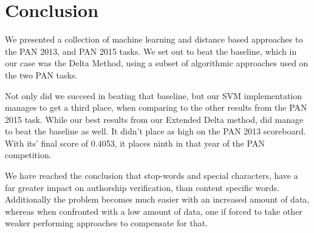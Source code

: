 \section{Conclusion} \label{sec:conclusion} 

We presented a collection of machine learning and distance based approaches
to the PAN 2013, and PAN 2015 tasks. We set out to beat the baseline, 
which in our case was the Delta Method, using a subset of algorithmic
approaches used on the two PAN tasks. 

Not only did we succeed in beating that baseline, but our SVM implementation
manages to get a third place, when comparing to the other results from the
PAN 2015 task. While our best results from our Extended Delta method, did
manage to beat the baseline as well. It didn't place as high on the PAN 2013
scoreboard. With its' final score of 0.4053, it places ninth in that year of the
PAN competition.

We have reached the conclusion that stop-words and special characters, have a
far greater impact on authorship verification, than content specific words.
Additionally the problem becomes much easier with an increased amount of data,
whereas when confronted with a low amount of data, one if forced to take other
weaker performing approaches to compensate for that.


